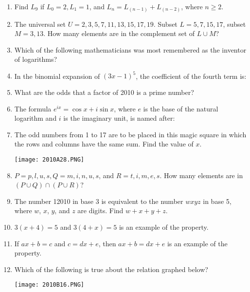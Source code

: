 \documentclass[../uilmath.tex]{subfiles}
\begin{document}
\begin{enumerate}[label=\bfseries\arabic*.]
    \item %
    Find $L_9$ if $L_0=2,L_1=1$, and $L_n=L_(n-1)+L_(n-2)$, where $n\geq 2$.

    \item %
    The universal set $U={2,3,5,7,11,13,15,17,19}$. Subset $L={5,7,15,17}$, subset $M={3,13}$. 
    How many elements are in the complement set of $L\cup M$?

    \item %
    Which of the following mathematicians was most remembered as the inventor of logarithms?

    \item %
    In the binomial expansion of $(3x-1)^5$, the coefficient of the fourth term is:

    \item %
    What are the odds that a factor of 2010 is a prime number?

    \item %
    The formula $e^{ix}=\cos x + i\sin x$, where $e$ is the base of the natural logarithm and $i$ is the imaginary unit, is named after:

    \item %
    The odd numbers from 1 to 17 are to be placed in this magic square in which the rows and columns have the same sum. Find the value of $x$.
    \begin{center}
        \texttt{[image: 2010A28.PNG]}
    \end{center}

    \item %
    $P={p,l,u,s}, Q={m,i,n,u,s}$, and $R={t,i,m,e,s}$. How many elements are in $(P\cup Q)\cap (P\cup R)$?

    \item %
    The number 12010 in base 3 is equivalent to the number $wxyz$ in base 5, where $w$, $x$, $y$, and $z$ are digits. Find $w+x+y+z$.

    \item %
    $3(x+4)=5$ and $3(4+x)=5$ is an example of the \blank property.

    \item %
    If $ax+b=c$ and $c=dx+e$, then $ax+b=dx+e$ is an example of the \blank property.

    \item %
    Which of the following is true about the relation graphed below?
    \begin{center}
        \texttt{[image: 2010B16.PNG]}
    \end{center}


\end{enumerate}
\end{document}
